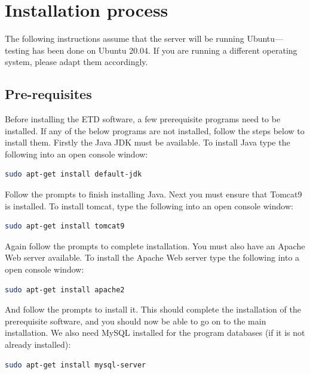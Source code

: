 \documentclass[a4paper,11pt]{article}
\begin{document}
\section{Installation process}
\label{sec:installation_process}

The following instructions assume that the server will be running Ubuntu---testing has been done on Ubuntu 20.04. If you are running a different operating system, please adapt them accordingly.

\subsection{Pre-requisites}
\label{sec:installation_process:prerequisites}

Before installing the ETD software, a few prerequisite programs need to be installed. If any of the below programs are not installed, follow the steps below to install them. Firstly the Java JDK must be available. To install Java type the following into an open console window: 

\begin{lstlisting}[language=bash]
sudo apt-get install default-jdk
\end{lstlisting}


Follow the prompts to finish installing Java. Next you must ensure that Tomcat9 is installed. To install tomcat, type the following into an open console window: 

\begin{lstlisting}[language=bash]
sudo apt-get install tomcat9
\end{lstlisting}


Again follow the prompts to complete installation. You must also have an Apache Web server available. To install the Apache Web server type the following into a open console window: 

\begin{lstlisting}[language=bash]
sudo apt-get install apache2
\end{lstlisting}

And follow the prompts to install it. This should complete the installation of the prerequisite software, and you should now be able to go on to the main installation. We also need MySQL installed for the program databases (if it is not already installed): 

\begin{lstlisting}[language=bash]
sudo apt-get install mysql-server
\end{lstlisting}
\end{document}
